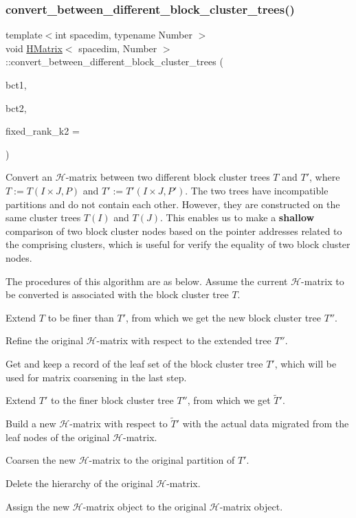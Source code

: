 \subsubsection{\texorpdfstring{convert\+\_\+between\+\_\+different\+\_\+block\+\_\+cluster\+\_\+trees()}{convert\_between\_different\_block\_cluster\_trees()}}
{\footnotesize\ttfamily template$<$int spacedim, typename Number $>$ \\
void \hyperlink{classHMatrix}{H\+Matrix}$<$ spacedim, Number $>$\+::convert\+\_\+between\+\_\+different\+\_\+block\+\_\+cluster\+\_\+trees (\begin{DoxyParamCaption}\item[{\hyperlink{classBlockClusterTree}{Block\+Cluster\+Tree}$<$ spacedim, Number $>$ \&}]{bct1,  }\item[{\hyperlink{classBlockClusterTree}{Block\+Cluster\+Tree}$<$ spacedim, Number $>$ \&}]{bct2,  }\item[{const unsigned int}]{fixed\+\_\+rank\+\_\+k2 = {} }\end{DoxyParamCaption})}

Convert an $\mathcal{H}$-\/matrix between two different block cluster trees $T$ and $T'$, where $T := T(I \times J, P)$ and $T' := T'(I \times J, P')$. The two trees have incompatible partitions and do not contain each other. However, they are constructed on the same cluster trees $T(I)$ and $T(J)$. This enables us to make a {\bfseries shallow} comparison of two block cluster nodes based on the pointer addresses related to the comprising clusters, which is useful for verify the equality of two block cluster nodes.

The procedures of this algorithm are as below. Assume the current $\mathcal{H}$-\/matrix to be converted is associated with the block cluster tree $T$.


\begin{DoxyEnumerate}
\item Extend $T$ to be finer than $T'$, from which we get the new block cluster tree $T''$.
\item Refine the original $\mathcal{H}$-\/matrix with respect to the extended tree $T''$.
\item Get and keep a record of the leaf set of the block cluster tree $T'$, which will be used for matrix coarsening in the last step.
\item Extend $T'$ to the finer block cluster tree $T''$, from which we get $\tilde{T}'$.
\item Build a new $\mathcal{H}$-\/matrix with respect to $\tilde{T}'$ with the actual data migrated from the leaf nodes of the original $\mathcal{H}$-\/matrix.
\item Coarsen the new $\mathcal{H}$-\/matrix to the original partition of $T'$.
\item Delete the hierarchy of the original $\mathcal{H}$-\/matrix.
\item Assign the new $\mathcal{H}$-\/matrix object to the original $\mathcal{H}$-\/matrix object.
\end{DoxyEnumerate}


